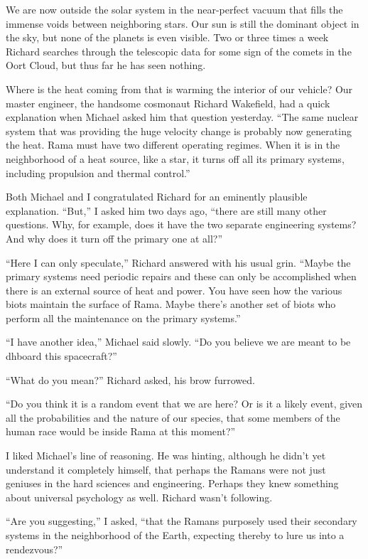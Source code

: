 \documentclass[]{article}
\begin{document}
We are now outside the solar system in the near-perfect vacuum that fills the immense voids between neighboring stars.  Our sun is still the dominant object in the sky, but none of the planets is even visible.  Two or three times a week Richard searches through the telescopic data for some sign of the comets in the Oort Cloud, but thus far he has seen nothing.

Where is the heat coming from that is warming the interior of our vehicle? Our master engineer, the handsome cosmonaut Richard Wakefield, had a quick explanation when Michael asked him that question yesterday.  “The same nuclear system that was providing the huge velocity change is probably now generating the heat.  Rama must have two different operating regimes.  When it is in the neighborhood of a heat source, like a star, it turns off all its primary systems, including propulsion and thermal control.”

Both Michael and I congratulated Richard for an eminently plausible explanation.  “But,” I asked him two days ago, “there are still many other questions.  Why, for example, does it have the two separate engineering systems? And why does it turn off the primary one at all?”

“Here I can only speculate,” Richard answered with his usual grin.  “Maybe the primary systems need periodic repairs and these can only be accomplished when there is an external source of heat and power.  You have seen how the various biots maintain the surface of Rama.  Maybe there’s another set of biots who perform all the maintenance on the primary systems.”

“I have another idea,” Michael said slowly.  “Do you believe we are meant to be dhboard this spacecraft?”

“What do you mean?” Richard asked, his brow furrowed.

“Do you think it is a random event that we are here? Or is it a likely event, given all the probabilities and the nature of our species, that some members of the human race would be inside Rama at this moment?”

I liked Michael’s line of reasoning.  He was hinting, although he didn’t yet understand it completely himself, that perhaps the Ramans were not just geniuses in the hard sciences and engineering.  Perhaps they knew something about universal psychology as well.  Richard wasn’t following.

“Are you suggesting,” I asked, “that the Ramans purposely used their secondary systems in the neighborhood of the Earth, expecting thereby to lure us into a rendezvous?”
\end{document}
